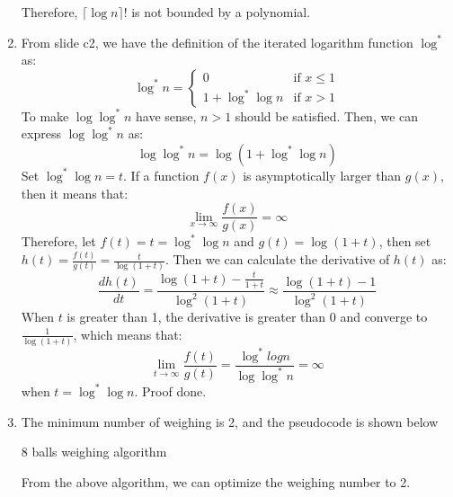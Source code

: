 \documentclass[12pt, a4paper]{article}
\begin{document}
\begin{enumerate}
          Therefore, $\lceil \log n \rceil !$ is not bounded by a polynomial.

    \item From slide c2, we have the definition of the iterated logarithm function $\log^*$ as:
          $$\log^* n = 
          \begin{cases}
              0 & \text{if } x \leq 1\\
              1 + \log^* \log n & \text{if } x > 1
          \end{cases}
          $$
          To make $\log \log^* n$ have sense, $n > 1$ should be satisfied. Then, we can express $\log \log^* n$ as:
          $$\log \log^* n = \log(1 + \log^* \log n)$$
          Set $\log^* \log n = t$. If a function $f(x)$ is asymptotically larger than $g(x)$, then it means that:
          $$\lim_{x\rightarrow \infty} \frac{f(x)}{g(x)} = \infty$$
          Therefore, let $f(t) = t = \log^* \log n$ and $g(t) = \log(1 + t)$, then set $h(t) = \frac{f(t)}{g(t)} = \frac{t}{\log(1 + t)}$.
          Then we can calculate the derivative of $h(t)$ as:
          $$\frac{dh(t)}{dt} = \frac{\log(1+t) - \frac{t}{1+t}}{\log^2(1+t)} \approx \frac{\log(1+t) - 1}{\log^2(1+t)}$$
          When $t$ is greater than 1, the derivative is greater than 0 and converge to $\frac{1}{\log(1+t)}$, which means that:
          $$\lim_{t\rightarrow \infty} \frac{f(t)}{g(t)} = \frac{\log^* log n}{\log \log^* n} = \infty$$
          when $t = \log^* \log n$. Proof done.

    \item The minimum number of weighing is 2, and the pseudocode is shown below
          
          \begin{algorithm}[!htb]
              \caption{8 balls weighing algorithm}
              \BlankLine

          \end{algorithm}
          From the above algorithm, we can optimize the weighing number to 2.
\end{enumerate}
\end{document}
